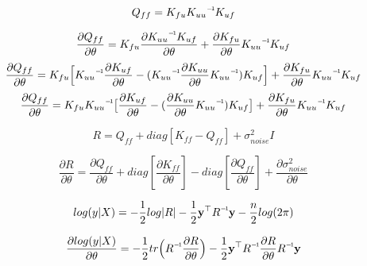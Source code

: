 \documentclass{article}
\newcommand\inv[1]{#1\raisebox{1.15ex}{$\scriptscriptstyle-\!1$}}
\begin{document}
  \begin{equation}
    Q_{ff} = K_{fu}  \inv{K_{uu}}  K_{uf}
  \end{equation}

  \begin{equation}
    \frac{\partial Q_{ff}}{\partial \theta} =
      K_{fu}  \frac{\partial {\inv{K_{uu}}  K_{uf}}}{\partial \theta} +
      {\frac{\partial K_{fu}}{\partial \theta}}  {\inv{K_{uu}}  K_{uf}}
  \end{equation}
  \begin{equation}
    \frac{\partial Q_{ff}}{\partial \theta} =
      K_{fu}  \Big[ \inv{K_{uu}}  \frac{\partial K_{uf}}{\partial \theta}  -
        (\inv{K_{uu}}  \frac{\partial K_{uu}}{\partial \theta}  \inv{K_{uu}})  K_{uf}
        \Big] +
        \frac{\partial K_{fu}}{\partial \theta}  \inv{K_{uu}}  K_{uf}
  \end{equation}
  \begin{equation}
    \frac{\partial Q_{ff}}{\partial \theta} =
      K_{fu}  \inv{K_{uu}}  \big[ \frac{\partial K_{uf}}{\partial \theta}  -
        (\frac{\partial K_{uu}}{\partial \theta}  \inv{K_{uu}})  K_{uf}
        \big] +
        \frac{\partial K_{fu}}{\partial \theta}  \inv{K_{uu}}  K_{uf}
  \end{equation}

  \begin{equation}
    R = Q_{ff} + diag[{K_{ff} - Q_{ff}}] + \sigma^{2}_{noise} I
  \end{equation}

  \begin{equation}
    \frac{\partial R}{\partial \theta} = \frac{\partial Q_{ff}}{\partial \theta}
    + diag[\frac{\partial K_{ff}}{\partial \theta}]
    - diag[\frac{\partial Q_{ff}}{\partial \theta}]
    + \frac{\partial \sigma^{2}_{noise}}{\partial \theta}
  \end{equation}

  \begin{equation}
    log(y | X) = -\frac{1}{2}log | R | -  \frac{1}{2} \textbf{y}^\top \inv{R} \textbf{y}
    - \frac{n}{2} log(2 \pi)
  \end{equation}


  \begin{equation}
    \frac{\partial log(y | X)}{\partial \theta} =
    - \frac{1}{2} tr \Big(\inv{R} \frac{{\partial R}}{\partial \theta} \Big)
    -\frac{1}{2} \textbf{y}^{\top} \inv{R} \frac{\partial R}{\partial \theta} \inv{R} \textbf{y}
  \end{equation}
\end{document}
